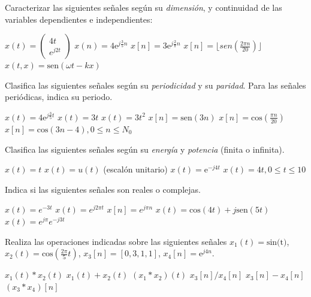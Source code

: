\documentclass[10pt,twoside,spanish,a4paper]{article}
\begin{document}
\vspace{-8em}

	\begin{itemize}
		\itemP Caracterizar las siguientes señales según su \emph{dimensión}, y continuidad de las variables dependientes e independientes:
		\begin{itemize}
				\itemB $x(t)=\begin{pmatrix}4t \\ e^{j 2t}\end{pmatrix}$
				\itemB $x(n)=4 \textrm{e}^{j\frac{3}{5}n}$
				\itemB $x[n]=3 \textrm{e}^{j\frac{2}{\pi}n}$
				\itemB $x[n]=\lfloor sen (\frac{2\pi n}{20})\rfloor$
				\itemB $x(t,x)=\textrm{sen}(\omega t-kx)$
		\end{itemize}
		
		\itemP Clasifica las siguientes señales según su \emph{periodicidad} y su \emph{paridad}. Para las señales periódicas, indica su periodo.
		\begin{itemize}
				\itemB $x(t)=4 \textrm{e}^{j\frac{3}{5}t}$
				\itemB $x(t)= 3 t$
				\itemB $x(t)= 3 t^2$
				\itemB $x[n]= \textrm{sen}(3 n)$
				\itemB $x[n]= \textrm{cos}(\frac{\pi n}{20})$
				\itemB $x[n]= \textrm{cos}(3 n - 4),0\leq n \leq N_0$ 
		\end{itemize}
		
		\itemP Clasifica las siguientes señales según su \emph{energía} y \emph{potencia} (finita o infinita).
		\begin{itemize}
				\itemB $x(t)=t$
				\itemB $x(t)=u(t)$ (escalón unitario)
				\itemB $x(t)=\textrm{e}^{- j 4 t}$
				\itemB $x(t)=4t,0\leq t \leq 10$
		\end{itemize}

		\clearpage
		\itemP Indica si las siguientes señales son reales o complejas.
		\begin{itemize}
				\itemB $x(t)=e^{-3 t}$
				\itemB $x(t)=e^{j 2\pi t}$
				\itemB $x[n]=e^{j \pi n}$
				\itemB $x(t)=\textrm{cos}(4t) + j \textrm{sen}(5t)$
				\itemB $x(t)=e ^{j \pi} e^{-j 3t}$
		\end{itemize}
		
		\itemP Realiza las operaciones indicadas sobre las siguientes señales $x_1(t)=\textrm{sin(t)}$, $x_2(t)=\textrm{cos}(\frac{2\pi}{5} t)$, $x_3[n]=[0,3,1,1]$, $x_4[n]=\textrm{e}^{j 4 n}$.
		\begin{itemize}
				\itemB $x_1(t) * x_2(t)$
				\itemB $x_1(t) + x_2(t)$
				\itemB $(x_1*x_2)(t)$
				\itemB $x_3[n] / x_4[n]$
				\itemB $x_3[n] - x_4[n]$
				\itemB $(x_3*x_4)[n]$
		\end{itemize}
		

\end{itemize}
\end{document}
